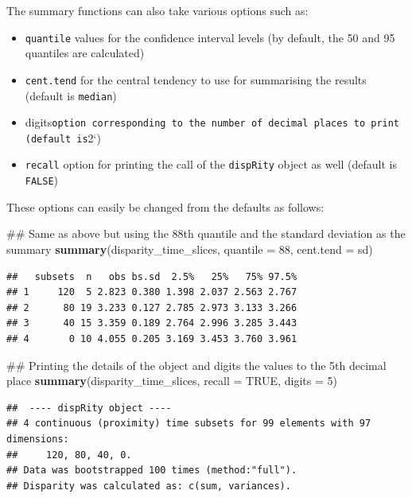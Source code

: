 \documentclass[]{book}
\newenvironment{Shaded}{\begin{snugshade}}{\end{snugshade}}
\newcommand{\KeywordTok}[1]{\textcolor[rgb]{0.13,0.29,0.53}{\textbf{#1}}}
\newcommand{\DataTypeTok}[1]{\textcolor[rgb]{0.13,0.29,0.53}{#1}}
\newcommand{\DecValTok}[1]{\textcolor[rgb]{0.00,0.00,0.81}{#1}}
\newcommand{\OtherTok}[1]{\textcolor[rgb]{0.56,0.35,0.01}{#1}}
\newcommand{\NormalTok}[1]{#1}
\providecommand{\tightlist}{%
  \setlength{\itemsep}{0pt}\setlength{\parskip}{0pt}}
\theoremstyle{definition}
\theoremstyle{definition}
\theoremstyle{definition}
\theoremstyle{remark}
\begin{document}
The summary functions can also take various options such as:

\begin{itemize}
\tightlist
\item
  \texttt{quantile} values for the confidence interval levels (by
  default, the 50 and 95 quantiles are calculated)
\item
  \texttt{cent.tend} for the central tendency to use for summarising the
  results (default is \texttt{median})
\item
  digits\texttt{option\ corresponding\ to\ the\ number\ of\ decimal\ places\ to\ print\ (default\ is}2`)
\item
  \texttt{recall} option for printing the call of the \texttt{dispRity}
  object as well (default is \texttt{FALSE})
\end{itemize}

These options can easily be changed from the defaults as follows:

\begin{Shaded}
\begin{Highlighting}[]
\NormalTok{## Same as above but using the 88th quantile and the standard deviation as the summary }
\KeywordTok{summary}\NormalTok{(disparity_time_slices, }\DataTypeTok{quantile =} \DecValTok{88}\NormalTok{, }\DataTypeTok{cent.tend =}\NormalTok{ sd)}
\end{Highlighting}
\end{Shaded}

\begin{verbatim}
##   subsets  n   obs bs.sd  2.5%   25%   75% 97.5%
## 1     120  5 2.823 0.380 1.398 2.037 2.563 2.767
## 2      80 19 3.233 0.127 2.785 2.973 3.133 3.266
## 3      40 15 3.359 0.189 2.764 2.996 3.285 3.443
## 4       0 10 4.055 0.205 3.169 3.453 3.760 3.961
\end{verbatim}

\begin{Shaded}
\begin{Highlighting}[]
\NormalTok{## Printing the details of the object and digits the values to the 5th decimal place}
\KeywordTok{summary}\NormalTok{(disparity_time_slices, }\DataTypeTok{recall =} \OtherTok{TRUE}\NormalTok{, }\DataTypeTok{digits =} \DecValTok{5}\NormalTok{)}
\end{Highlighting}
\end{Shaded}

\begin{verbatim}
##  ---- dispRity object ---- 
## 4 continuous (proximity) time subsets for 99 elements with 97 dimensions:
##     120, 80, 40, 0.
## Data was bootstrapped 100 times (method:"full").
## Disparity was calculated as: c(sum, variances).
\end{verbatim}
\end{document}
